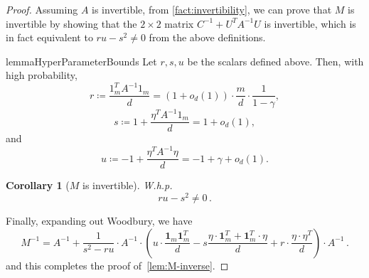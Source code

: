 \documentclass[12pt]{article}
\def\1{\bm{1}}
\newtheorem{lemma}[theorem]{Lemma}
\newtheorem{claim}[theorem]{Claim}
\newtheorem{corollary}[theorem]{Corollary}
\newcommand{\gam}{\gamma}
\newcommand{\todo}[1]{\textcolor{red}{(#1)}}
\newcommand{\Authornote}[3]{{\sf\footnotesize\color{#3}{[#1: #2]}}}
\newcommand{\Authornote}[3]{}
\newcommand{\jnote}[1]{\Authornote{Jeff}{#1}{blue}}
\begin{document}
\begin{proof}
Assuming $A$ is invertible, from \cref{fact:invertibility}, we can prove that $M$ is invertible  by showing that the $2\times 2$ matrix $C^{-1} + U^T A^{-1}U$ is invertible, which is in fact equivalent to $ru - s^2 \neq 0$ from the above definitions.




\begin{restatable}{lemma}{HyperParameterBounds}
\label{lem:hyper-parameter-bounds}
Let \(r,s,u\) be the scalars defined above. Then, with high probability,
\[
    r\coloneqq \frac{1_m^T A^{-1} 1_m}{d}
    =
    (1+o_d(1))\cdot \frac{m}{d}\cdot \frac{1}{1-\gamma},
\]
\[
    s \coloneqq 1+ \frac{\eta^T A^{-1} 1_m}{d}  = 1+o_d(1),
\]
and
\[
    u \coloneqq -1 + \frac{\eta^T A^{-1} \eta }{d}  = -1+\gamma+o_d(1).
\]
\end{restatable}

\begin{corollary}[$M$ is invertible] W.h.p. \[ 
ru-s^2 \neq 0\,.
\]	
\end{corollary}
Finally, expanding out Woodbury, we have \[ 
M^{-1} = A^{-1} + \frac{1}{s^2-ru}\cdot A^{-1} \cdot (u\cdot \frac{\1_m\1_m^T}{d} -s \frac{\eta\cdot \1_m^T+ \1_m^T \cdot \eta }{d}
 + r \cdot \frac{\eta \cdot \eta^T }{d}) \cdot A^{-1}\,.   \]
and this completes the proof of~\cref{lem:M-inverse}.
\end{proof}
\end{document}
